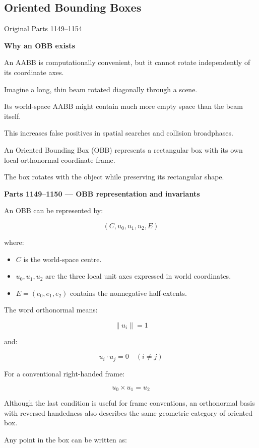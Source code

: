 \subsection{Oriented Bounding Boxes}\label{03-visual-computing-i-ch021-oriented-bounding-boxes}

Original Parts 1149--1154

\textbf{Why an OBB exists}

An AABB is computationally convenient, but it cannot rotate independently of its coordinate axes.

Imagine a long, thin beam rotated diagonally through a scene.

Its world-space AABB might contain much more empty space than the beam itself.

This increases false positives in spatial searches and collision broadphases.

An Oriented Bounding Box (OBB) represents a rectangular box with its own local orthonormal coordinate frame.

The box rotates with the object while preserving its rectangular shape.

\textbf{Parts 1149--1150 --- OBB representation and invariants}

An OBB can be represented by:

\[
(C,u_0,u_1,u_2,E)
\]

where:

\begin{itemize}
\tightlist
\item
  \(C\) is the world-space centre.
\item
  \(u_0,u_1,u_2\) are the three local unit axes expressed in world coordinates.
\item
  \(E=(e_0,e_1,e_2)\) contains the nonnegative half-extents.
\end{itemize}

The word orthonormal means:

\[
\boxed{\|u_i\|=1}
\]

and:

\[
\boxed{u_i\cdot u_j=0\quad(i\ne j)}
\]

For a conventional right-handed frame:

\[
u_0\times u_1=u_2
\]

Although the last condition is useful for frame conventions, an orthonormal basis with reversed handedness also describes the same geometric category of oriented box.

Any point in the box can be written as:

